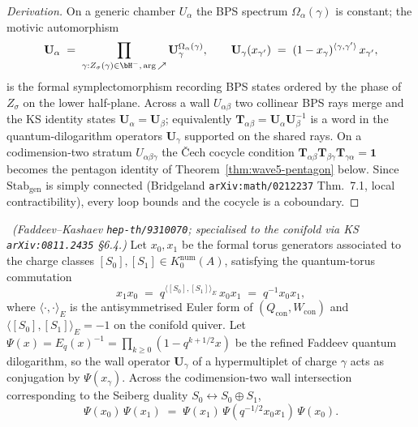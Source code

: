 \begin{proof}[Derivation]
On a generic chamber $U_\alpha$ the BPS spectrum
$\Omega_\alpha(\gamma)$ is constant; the motivic automorphism
\[
  \mathbf{U}_\alpha
  \;=\; \prod_{\gamma : Z_\sigma(\gamma) \in \bH^-,\,
    \mathrm{arg}\,\nearrow}
      \mathbf{U}_\gamma^{\Omega_\alpha(\gamma)},
  \qquad
  \mathbf{U}_\gamma(x_{\gamma'})
  \;=\; (1 - x_\gamma)^{\langle \gamma, \gamma'\rangle}\, x_{\gamma'},
\]
is the formal symplectomorphism recording BPS states ordered by the
phase of $Z_\sigma$ on the lower half-plane. Across a wall
$U_{\alpha\beta}$ two collinear BPS rays merge and the KS identity
states $\mathbf{U}_\alpha = \mathbf{U}_\beta$; equivalently
$\mathbf{T}_{\alpha\beta} = \mathbf{U}_\alpha \mathbf{U}_\beta^{-1}$
is a word in the quantum-dilogarithm operators $\mathbf{U}_\gamma$
supported on the shared rays. On a codimension-two stratum
$U_{\alpha\beta\gamma}$ the \v{C}ech cocycle condition
$\mathbf{T}_{\alpha\beta} \mathbf{T}_{\beta\gamma}
\mathbf{T}_{\gamma\alpha} = \mathbf{1}$ becomes the pentagon identity
of Theorem~\ref{thm:wave5-pentagon} below. Since
$\mathrm{Stab}_{\mathrm{gen}}$ is simply connected (Bridgeland
\texttt{arXiv:math/0212237} Thm.~7.1, local contractibility), every
loop bounds and the cocycle is a coboundary.
\end{proof}

\begin{theorem}
\label{thm:wave5-pentagon}
\ClaimStatusProvedElsewhere\ \emph{(Faddeev--Kashaev
\texttt{hep-th/9310070}; specialised to the conifold via KS
\texttt{arXiv:0811.2435} §6.4.)}
Let $x_0, x_1$ be the formal torus generators associated to the charge
classes $[S_0], [S_1] \in K_0^{\mathrm{num}}(A)$, satisfying the
quantum-torus commutation
\[
  x_1 x_0 \;=\; q^{\langle [S_0], [S_1]\rangle_E}\, x_0 x_1
  \;=\; q^{-1} x_0 x_1,
\]
where $\langle \cdot, \cdot\rangle_E$ is the antisymmetrised Euler
form of $(Q_{\mathrm{con}}, W_{\mathrm{con}})$ and
$\langle [S_0], [S_1]\rangle_E = -1$ on the conifold quiver. Let
$\Psi(x) = E_q(x)^{-1} = \prod_{k \geq 0} (1 - q^{k+1/2} x)$ be the
refined Faddeev quantum dilogarithm, so the wall operator
$\mathbf{U}_\gamma$ of a hypermultiplet of charge $\gamma$ acts as
conjugation by $\Psi(x_\gamma)$. Across the codimension-two wall
intersection corresponding to the Seiberg duality
$S_0 \leftrightarrow S_0 \oplus S_1$,
\begin{equation}\label{eq:wave5-pentagon}
  \Psi(x_0)\, \Psi(x_1)
  \;=\; \Psi(x_1)\, \Psi(q^{-1/2} x_0 x_1)\, \Psi(x_0).
\end{equation}
\end{theorem}

